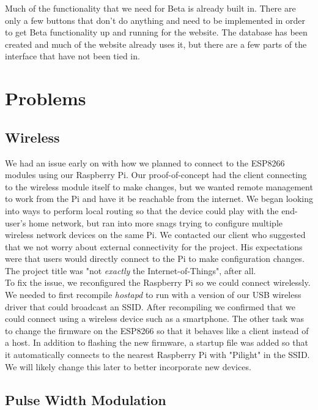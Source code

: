 \documentclass[oneside,openright]{book}
\begin{document}
Much of the functionality that we need for Beta is already built in. There are
only a few buttons that don't do anything and need to be implemented in order
to get Beta functionality up and running for the website. The database has been
created and much of the website already uses it, but there are a few parts of
the interface that have not been tied in.

\section{Problems}

\subsection{Wireless}

We had an issue early on with how we planned to connect to the ESP8266 modules
using our Raspberry Pi. Our proof-of-concept had the client connecting to the
wireless module itself to make changes, but we wanted remote management to work
from the Pi and have it be reachable from the internet. We began looking into
ways to perform local routing so that the device could play with the end-user's
home network, but ran into more snags trying to configure multiple wireless
network devices on the same Pi. We contacted our client who suggested that we
not worry about external connectivity for the project. His expectations were
that users would directly connect to the Pi to make configuration changes. The
project title was "not \textit{exactly} the Internet-of-Things", after all.\\

To fix the issue, we reconfigured the Raspberry Pi so we could connect
wirelessly. We needed to first recompile \textit{hostapd} to run with a version
of our USB wireless driver that could broadcast an SSID. After recompiling we
confirmed that we could connect using a wireless device such as a smartphone.
The other task was to change the firmware on the ESP8266 so that it behaves
like a client instead of a host. In addition to flashing the new firmware, a
startup file was added so that it automatically connects to the nearest
Raspberry Pi with "Pilight" in the SSID. We will likely change this later to
better incorporate new devices.

\subsection{Pulse Width Modulation}
\end{document}
